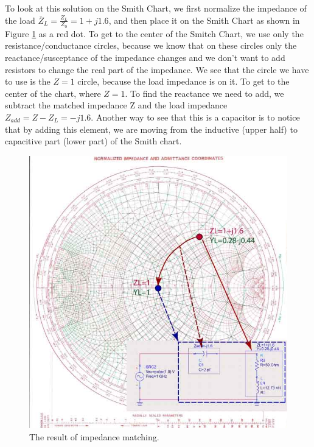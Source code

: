 \documentclass{ximera}
\begin{document}
To look at this solution on the Smith Chart, we first normalize the impedance of the load $\bar{Z}_L=\frac{Z_L}{Z_0}=1+j1.6$, and then place it on the Smith Chart as shown in Figure \ref{fig:SimpleMatch} as a red dot. To get to the center of the Smitch Chart, we use only the resistance/conductance circles, because we know that on these circles only the reactance/susceptance of the impedance changes and we don't want to add resistors to change the real part of the impedance. We see that the circle we have to use is the $Z=1$ circle, because the load impedance  is on it.  To get to the center of the chart, where $Z=1$. To find the reactance we need to add, we subtract  the matched impedance Z and the load impedance $Z_{add}=Z- Z_L=-j1.6$. Another way to see that this is a capacitor is to notice that by adding this element, we are moving from the inductive (upper half) to capacitive part (lower part) of the Smith chart. 

\begin{figure}[htbp]
\begin{center}
\includegraphics[scale=0.4]{../jpg/test.jpg}
\end{center}
\caption{The result of impedance matching.}
\label{fig:SimpleMatch}
\end{figure}
\end{document}
